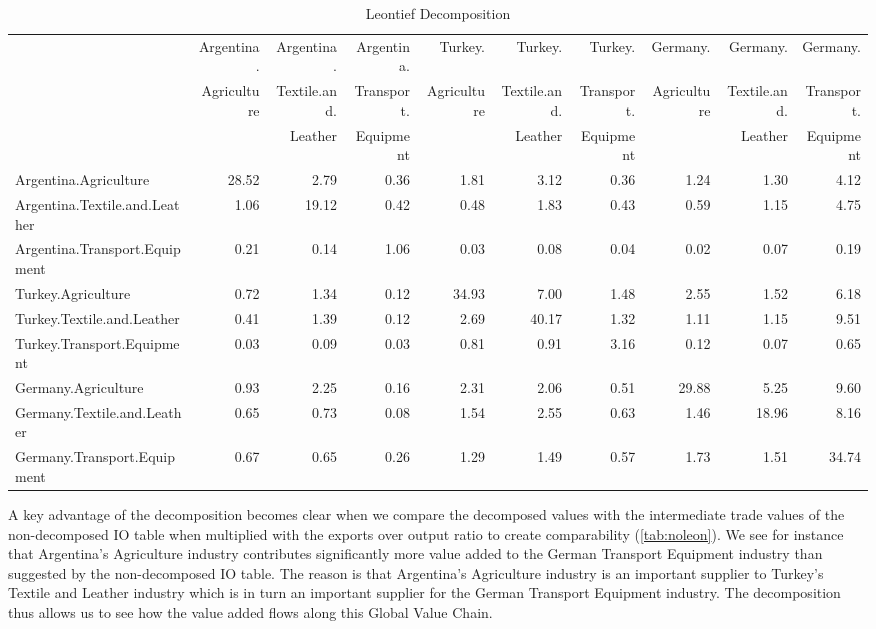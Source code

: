 \documentclass[a4paper]{article}\usepackage[]{graphicx}\usepackage[]{color}
\begin{document}
\begin{sidewaystable}
  \caption{Leontief Decomposition}
  \label{tab:leon}
  \begin{tabular}{lrrrrrrrrr}
    \hline
          & Argentina. & Argentina. & Argentina. & Turkey. & Turkey. & Turkey. & Germany. & Germany. & Germany.\\
          & Agriculture & Textile.and. & Transport. & Agriculture & Textile.and. & Transport. & Agriculture & Textile.and. & Transport.\\
          & & Leather & Equipment & & Leather & Equipment & & Leather & Equipment\\
    \hline
    Argentina.Agriculture & 28.52 & 2.79  & 0.36  & 1.81  & 3.12  & 0.36  & 1.24  & 1.30  & 4.12 \\
    Argentina.Textile.and.Leather & 1.06  & 19.12 & 0.42  & 0.48  & 1.83  & 0.43  & 0.59  & 1.15  & 4.75 \\
    Argentina.Transport.Equipment & 0.21  & 0.14  & 1.06  & 0.03  & 0.08  & 0.04  & 0.02  & 0.07  & 0.19 \\
    Turkey.Agriculture & 0.72  & 1.34  & 0.12  & 34.93 & 7.00  & 1.48  & 2.55  & 1.52  & 6.18 \\
    Turkey.Textile.and.Leather & 0.41  & 1.39  & 0.12  & 2.69  & 40.17 & 1.32  & 1.11  & 1.15  & 9.51 \\
    Turkey.Transport.Equipment & 0.03  & 0.09  & 0.03  & 0.81  & 0.91  & 3.16  & 0.12  & 0.07  & 0.65 \\
    Germany.Agriculture & 0.93  & 2.25  & 0.16  & 2.31  & 2.06  & 0.51  & 29.88 & 5.25  & 9.60 \\
    Germany.Textile.and.Leather & 0.65  & 0.73  & 0.08  & 1.54  & 2.55  & 0.63  & 1.46  & 18.96 & 8.16 \\
    Germany.Transport.Equipment & 0.67  & 0.65  & 0.26  & 1.29  & 1.49  & 0.57  & 1.73  & 1.51  & 34.74 \\
    \hline
    \end{tabular}
\end{sidewaystable}


A key advantage of the decomposition becomes clear when we compare the decomposed values with the intermediate trade
values of the non-decomposed IO table when multiplied with the exports over output ratio to create
comparability (\cref{tab:noleon}).
We see for instance that Argentina's Agriculture industry contributes significantly more value added to the German Transport Equipment industry than suggested by the non-decomposed IO table.
The reason is that Argentina's Agriculture industry is an important supplier to Turkey's Textile and Leather industry which is in turn an important supplier for the German Transport Equipment industry.
The decomposition thus allows us to see how the value added flows along this Global Value Chain.
\end{document}
